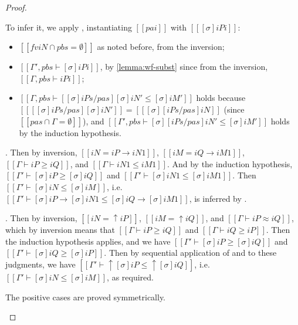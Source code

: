 \begin{proof}
\begin{caseof}
      To infer it, we apply , 
      instantiating $[[pai]]$ with $[[ [σ]iPi ]]$:
      \begin{itemize}
        \item $[[fv iN ∩ {pbs} = ∅ ]]$ as noted before, from the inversion;
        \item $[[Γ', pbs ⊢ [σ]iPi]]$, by \cref{lemma:wf-subst} since from the inversion,
        $[[Γ, pbs ⊢ iPi]]$;
        \item $[[Γ, pbs ⊢ [ [σ]iPs/pas ][σ]iN' ≤ [σ]iM']]$ holds because 
        $[[ [ [σ]iPs/pas ][σ]iN' ]] = [[ [σ][iPs/pas]iN ]]$ (since $[[{pas} ∩ {Γ} = ∅]]$), 
        and $[[Γ', pbs ⊢ [σ][iPs/pas]iN' ≤ [σ]iM']]$ holds by the induction hypothesis.
      \end{itemize}
    \item {}. Then by inversion,
      $[[iN = iP → iN1]]$, $[[iM = iQ → iM1]]$, $[[Γ ⊢ iP ≥ iQ]]$, and $[[Γ ⊢ iN1 ≤ iM1]]$.
      And by the induction hypothesis, $[[Γ' ⊢ [σ]iP ≥ [σ]iQ]]$ and $[[Γ' ⊢ [σ]iN1 ≤ [σ]iM1]]$.
      Then $[[Γ' ⊢ [σ]iN ≤ [σ]iM]]$, i.e. $[[Γ' ⊢ [σ]iP → [σ]iN1 ≤ [σ]iQ → [σ]iM1]]$,
      is inferred by .
    \item {}. Then by inversion,
      $[[iN = ↑iP]]$, $[[iM = ↑iQ]]$, and $[[Γ ⊢ iP ≈ iQ]]$,
      which by inversion means that $[[Γ ⊢ iP ≥ iQ]]$ and $[[Γ ⊢ iQ ≥ iP]]$.
      Then the induction hypothesis applies, and we have $[[Γ' ⊢ [σ]iP ≥ [σ]iQ]]$
      and $[[Γ' ⊢ [σ]iQ ≥ [σ]iP]]$. 
      Then by sequential application of  
      and  to these judgments,
      we have $[[Γ' ⊢ ↑[σ]iP ≤ ↑[σ]iQ]]$, i.e.
      $[[Γ' ⊢ [σ]iN ≤ [σ]iM]]$, as required.
    \item The positive cases are proved symmetrically.
  \end{caseof}
\end{proof}



